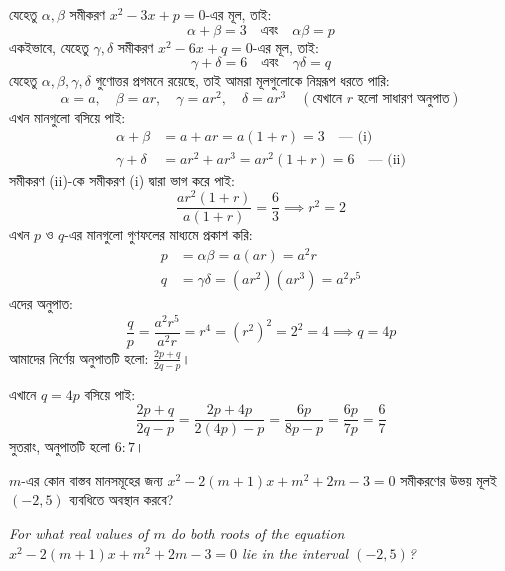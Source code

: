\documentclass[12pt, a4paper]{article}
\begin{document}
\begin{tcolorbox}[solutionbox={সমাধান (Solution)}]
    \noindent
    যেহেতু $\alpha, \beta$ সমীকরণ $x^2 - 3x + p = 0$-এর মূল, তাই:
    \[ \alpha+\beta = 3 \quad \text{এবং} \quad \alpha\beta = p \]
    একইভাবে, যেহেতু $\gamma, \delta$ সমীকরণ $x^2 - 6x + q = 0$-এর মূল, তাই:
    \[ \gamma+\delta = 6 \quad \text{এবং} \quad \gamma\delta = q \]
    যেহেতু $\alpha, \beta, \gamma, \delta$ গুণোত্তর প্রগমনে রয়েছে, তাই আমরা মূলগুলোকে নিম্নরূপ ধরতে পারি:
    \[ \alpha = a, \quad \beta = ar, \quad \gamma = ar^2, \quad \delta = ar^3 \quad (\text{যেখানে } r \text{ হলো সাধারণ অনুপাত}) \]
    এখন মানগুলো বসিয়ে পাই:
    \begin{align*}
        \alpha+\beta &= a + ar = a(1+r) = 3 \quad \text{--- (i)} \\
        \gamma+\delta &= ar^2 + ar^3 = ar^2(1+r) = 6 \quad \text{--- (ii)}
    \end{align*}
    সমীকরণ (ii)-কে সমীকরণ (i) দ্বারা ভাগ করে পাই:
    \[ \frac{ar^2(1+r)}{a(1+r)} = \frac{6}{3} \implies r^2 = 2 \]
    এখন $p$ ও $q$-এর মানগুলো গুণফলের মাধ্যমে প্রকাশ করি:
    \begin{align*}
        p &= \alpha\beta = a(ar) = a^2r \\
        q &= \gamma\delta = (ar^2)(ar^3) = a^2r^5
    \end{align*}
    এদের অনুপাত:
    \[ \frac{q}{p} = \frac{a^2r^5}{a^2r} = r^4 = (r^2)^2 = 2^2 = 4 \implies q = 4p \]
    আমাদের নির্ণেয় অনুপাতটি হলো: $\frac{2p+q}{2q-p}$। 
    
    এখানে $q = 4p$ বসিয়ে পাই:
    \[ \frac{2p+q}{2q-p} = \frac{2p+4p}{2(4p)-p} = \frac{6p}{8p-p} = \frac{6p}{7p} = \frac{6}{7} \]
    সুতরাং, অনুপাতটি হলো $6:7$।
\end{tcolorbox}
\begin{tcolorbox}[questionbox={প্রশ্ন (Question) 40}]
    \noindent
    $m$-এর কোন বাস্তব মানসমূহের জন্য $x^2 - 2(m+1)x + m^2 + 2m - 3 = 0$ সমীকরণের উভয় মূলই $(-2, 5)$ ব্যবধিতে অবস্থান করবে?
    
    \vspace{0.8em}
    \begin{english}
    \noindent\textit{\color{darkgray}
    For what real values of $m$ do both roots of the equation $x^2 - 2(m+1)x + m^2 + 2m - 3 = 0$ lie in the interval $(-2, 5)$?
    }
    \end{english}
\end{tcolorbox}
\end{document}
